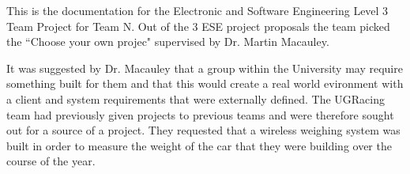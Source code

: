 This is the documentation for the Electronic and Software Engineering Level 3 Team Project for Team N. Out of the 3 ESE project proposals the team picked the ``Choose your own projec" supervised by Dr. Martin Macauley.

It was suggested by Dr. Macauley that a group within the University may require something built for them and that this would create a real world evironment with a client and system requirements that were externally defined. The UGRacing team had previously given projects to previous teams and were therefore sought out for a source of a project. They requested that a wireless weighing system was built in order to measure the weight of the car that they were building over the course of the year. 
